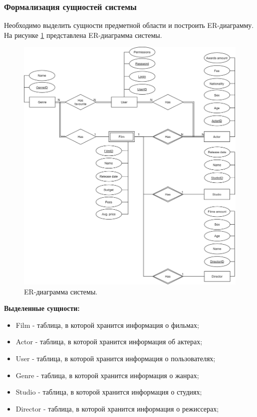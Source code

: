 \subsubsection{Формализация сущностей системы}
Необходимо выделить сущности предметной области и построить ER-диаграмму. 
На рисунке \ref{img:ER} представлена ER-диаграмма системы.
\begin{figure}[h!]
	\centering
	\includegraphics[scale=0.25]{img/ER.png}
	\caption{ER-диаграмма системы.}
	\label{img:ER}
\end{figure}
\newpage

\textbf{Выделенные сущности:}
\begin{itemize}
	\item[1)] Film - таблица, в которой хранится информация о фильмах;
	\item[2)] Actor - таблица, в которой хранится информация об актерах;
	\item[3)] User - таблица, в которой хранится информация о пользователях;
	\item[4)] Genre - таблица, в которой хранится информация о жанрах;
	\item[5)] Studio - таблица, в которой хранится информация о студиях;
	\item[6)] Director - таблица, в которой хранится информация о режиссерах;
\end{itemize}

